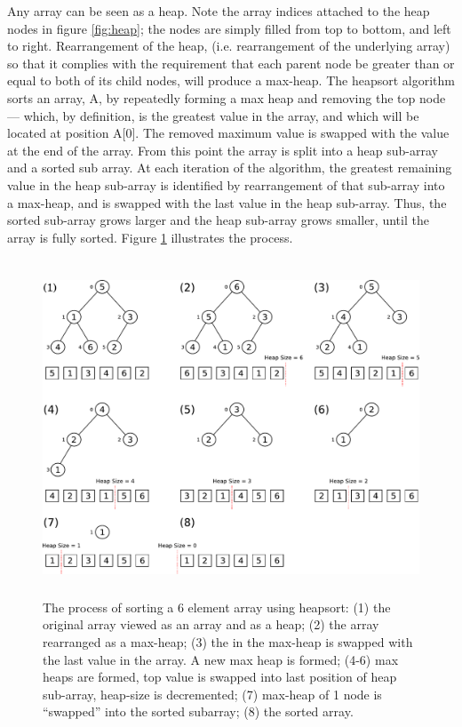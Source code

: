 \documentclass[12pt, a4paper]{article}
\begin{document}
Any array can be seen as a heap. Note the array indices attached to the heap nodes in figure \ref{fig:heap}; the nodes are simply filled from top to bottom, and left to right. Rearrangement of the heap, (i.e. rearrangement of the underlying array) so that it complies with the requirement that each parent node be greater than or equal to both of its child nodes, will produce a max-heap. The heapsort algorithm sorts an array, A, by repeatedly forming a max heap and removing the top node — which, by definition, is the greatest value in the array, and which will be located at position A[0]. The removed maximum value is swapped with the value at the end of the array. From this point the array is split into a heap sub-array and a sorted sub array. At each iteration of the algorithm, the greatest remaining value in the heap sub-array is identified by rearrangement of that sub-array into a max-heap, and is swapped with the last value in the heap sub-array. Thus, the sorted sub-array grows larger and the heap sub-array grows smaller, until the array is fully sorted. Figure \ref{fig:heapsort} illustrates the process.

\begin{figure}[H]
    \centering
    \includegraphics[height=10cm]{heap_sort2.pdf}
    \caption{\label{fig:heapsort}The process of sorting a 6 element array using heapsort: (1) the original array viewed as an array and as a heap; (2) the array rearranged as a max-heap; (3) the in the max-heap is swapped with the last value in the array. A new max heap is formed; (4-6) max heaps are formed, top value is swapped into last position of heap sub-array, heap-size is decremented; (7) max-heap of 1 node is   ``swapped'' into the sorted subarray; (8) the sorted array.}
\end{figure}
\end{document}
